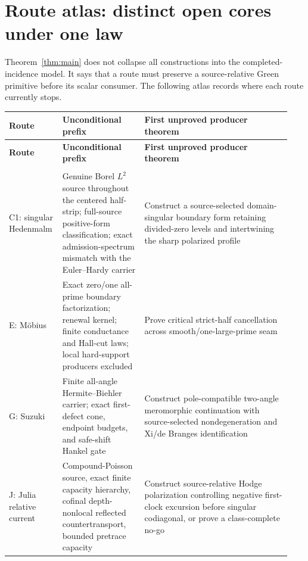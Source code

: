\documentclass[11pt]{article}
\theoremstyle{definition}
\theoremstyle{remark}
\begin{document}
\section{Route atlas: distinct open cores under one law}
\label{sec:routes}

Theorem~\ref{thm:main} does not collapse all constructions into the
completed-incidence model.  It says that a route must preserve a
source-relative Green primitive before its scalar consumer.  The
following atlas records where each route currently stops.

\begingroup
\footnotesize
\setlength{\tabcolsep}{4pt}
\renewcommand{\arraystretch}{1.18}
\begin{longtable}{
  >{\raggedright\arraybackslash}p{0.16\linewidth}
  >{\raggedright\arraybackslash}p{0.28\linewidth}
  >{\raggedright\arraybackslash}p{0.50\linewidth}}
\toprule
\textbf{Route} & \textbf{Unconditional prefix} &
\textbf{First unproved producer theorem}\\
\midrule
\endfirsthead
\toprule
\textbf{Route} & \textbf{Unconditional prefix} &
\textbf{First unproved producer theorem}\\
\midrule
\endhead
\midrule
\multicolumn{3}{r}{\emph{Continued on next page}}\\
\endfoot
\bottomrule
\endlastfoot
C1: singular Hedenmalm
& Genuine Borel \(L^2\) source throughout the centered half-strip;
  full-source positive-form classification; exact admission-spectrum
  mismatch with the Euler--Hardy carrier
& Construct a source-selected domain-singular boundary form retaining
  divided-zero levels and intertwining the sharp polarized profile\\

E: M\"obius
& Exact zero/one all-prime boundary factorization; renewal kernel; finite
  conductance and Hall-cut laws; local hard-support producers excluded
& Prove critical strict-half cancellation across smooth/one-large-prime
  seam\\

G: Suzuki
& Finite all-angle Hermite--Biehler carrier; exact first-defect cone,
  endpoint budgets, and safe-shift Hankel gate
& Construct pole-compatible two-angle meromorphic continuation with
  source-selected nondegeneration and Xi/de Branges identification\\

J: Julia relative current
& Compound-Poisson source, exact finite capacity hierarchy, cofinal
  depth-nonlocal reflected countertransport, bounded pretrace capacity
& Construct source-relative Hodge polarization controlling negative
  first-clock excursion before singular codiagonal, or prove a
  class-complete no-go\\


\end{longtable}
\end{document}
